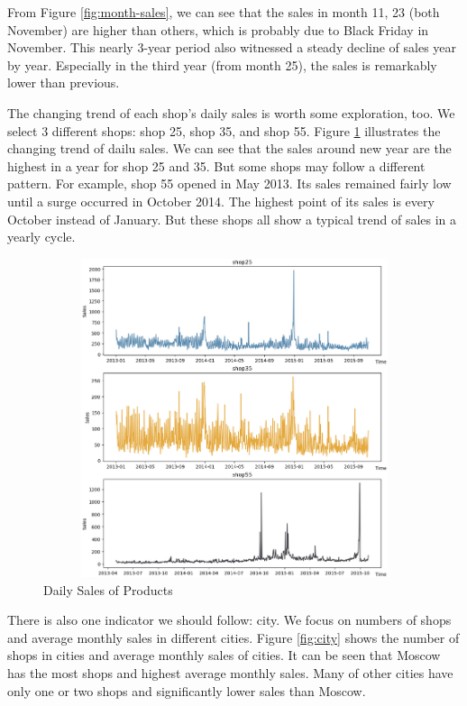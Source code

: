 \documentclass{article}
\begin{document}
From Figure \ref{fig:month-sales}, we can see that the sales in month 11, 23 (both November) are higher than others, which is probably due to Black Friday in November. This nearly 3-year period also witnessed a steady decline of sales year by year. Especially in the third year (from month 25), the sales is remarkably lower than previous.\par

The changing trend of each shop's daily sales is worth some exploration, too. We select 3 different shops: shop 25, shop 35, and shop 55. Figure \ref{fig:shop-sales} illustrates the changing trend of dailu sales. We can see that the sales around new year are the highest in a year for shop 25 and 35. But some shops may follow a different pattern. For example, shop 55 opened in May 2013. Its sales remained fairly low until a surge occurred in October 2014. The highest point of its sales is every October instead of January. But these shops all show a typical trend of sales in a yearly cycle.

\begin{figure}[!ht]
    \centering
    \includegraphics[width=12cm, height=9.35cm]{./figs/shop-sales.png}
    \caption{Daily Sales of Products}
    \label{fig:shop-sales}
\end{figure}

There is also one indicator we should follow: city. We focus on numbers of shops and average monthly sales in different cities. Figure \ref{fig:city} shows the number of shops in cities and average monthly sales of cities. It can be seen that Moscow has the most shops and highest average monthly sales. Many of other cities have only one or two shops and significantly lower sales than Moscow.
\end{document}
